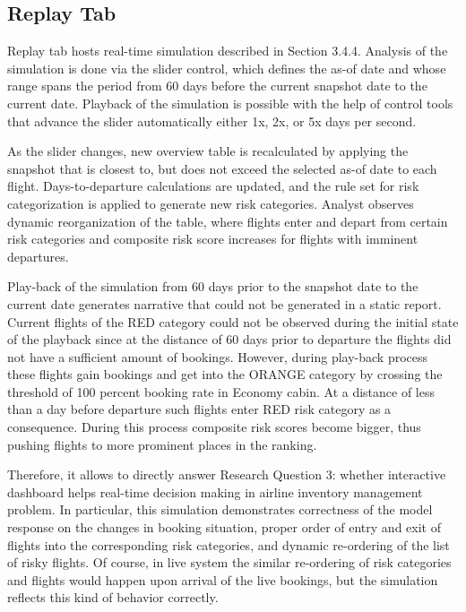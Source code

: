 \subsection{Replay Tab}

Replay tab hosts real-time simulation described in Section 3.4.4. Analysis of the simulation is done via the slider control, which defines the as-of date and whose range spans the period from 60 days before the current snapshot date to the current date. Playback of the simulation is possible with the help of control tools that advance the slider automatically either 1x, 2x, or 5x days per second.

As the slider changes, new overview table is recalculated by applying the snapshot that is closest to, but does not exceed the selected as-of date to each flight. Days-to-departure calculations are updated, and the rule set for risk categorization is applied to generate new risk categories. Analyst observes dynamic reorganization of the table, where flights enter and depart from certain risk categories and composite risk score increases for flights with imminent departures.

Play-back of the simulation from 60 days prior to the snapshot date to the current date generates narrative that could not be generated in a static report. Current flights of the RED category could not be observed during the initial state of the playback since at the distance of 60 days prior to departure the flights did not have a sufficient amount of bookings. However, during play-back process these flights gain bookings and get into the ORANGE category by crossing the threshold of 100 percent booking rate in Economy cabin. At a distance of less than a day before departure such flights enter RED risk category as a consequence. During this process composite risk scores become bigger, thus pushing flights to more prominent places in the ranking.

Therefore, it allows to directly answer Research Question 3: whether interactive dashboard helps real-time decision making in airline inventory management problem. In particular, this simulation demonstrates correctness of the model response on the changes in booking situation, proper order of entry and exit of flights into the corresponding risk categories, and dynamic re-ordering of the list of risky flights. Of course, in live system the similar re-ordering of risk categories and flights would happen upon arrival of the live bookings, but the simulation reflects this kind of behavior correctly.

